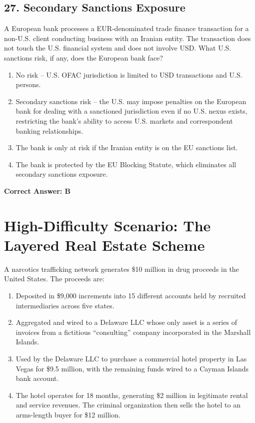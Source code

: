 \documentclass[11pt,a4paper]{article}
\begin{document}
	\subsection{27. Secondary Sanctions Exposure}
	A European bank processes a EUR-denominated trade finance transaction for a non-U.S. client conducting business with an Iranian entity. The transaction does not touch the U.S. financial system and does not involve USD. What U.S. sanctions risk, if any, does the European bank face?
	\begin{enumerate}[label=\Alph*.]
		\item No risk -- U.S. OFAC jurisdiction is limited to USD transactions and U.S. persons.
		\item Secondary sanctions risk -- the U.S. may impose penalties on the European bank for dealing with a sanctioned jurisdiction even if no U.S. nexus exists, restricting the bank's ability to access U.S. markets and correspondent banking relationships.
		\item The bank is only at risk if the Iranian entity is on the EU sanctions list.
		\item The bank is protected by the EU Blocking Statute, which eliminates all secondary sanctions exposure.
	\end{enumerate}
	\textbf{Correct Answer: B}
	
	\section{High-Difficulty Scenario: The Layered Real Estate Scheme}
	
	\noindent A narcotics trafficking network generates \$10 million in drug proceeds in the United States. The proceeds are:
	
	\begin{enumerate}
		\item Deposited in \$9,000 increments into 15 different accounts held by recruited intermediaries across five states.
		\item Aggregated and wired to a Delaware LLC whose only asset is a series of invoices from a fictitious ``consulting'' company incorporated in the Marshall Islands.
		\item Used by the Delaware LLC to purchase a commercial hotel property in Las Vegas for \$9.5 million, with the remaining funds wired to a Cayman Islands bank account.
		\item The hotel operates for 18 months, generating \$2 million in legitimate rental and service revenues. The criminal organization then sells the hotel to an arms-length buyer for \$12 million.
	\end{enumerate}
	
\end{document}
